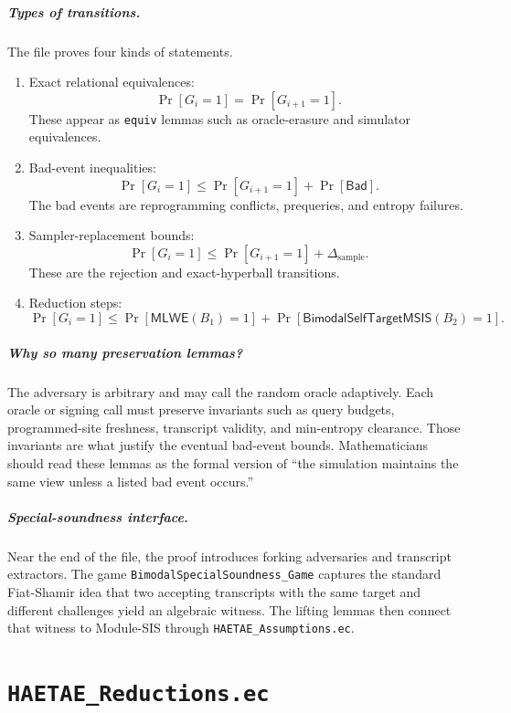 \documentclass[11pt]{report}
\newcommand{\file}[1]{\nolinkurl{#1}}
\newcommand{\ec}[1]{\nolinkurl{#1}}
\newcommand{\ecchapter}[2]{\chapter{\texorpdfstring{\texttt{#1}}{#2}}}
\newcommand{\MLWE}{\mathsf{MLWE}}
\newcommand{\BMSIS}{\mathsf{BimodalSelfTargetMSIS}}
\theoremstyle{definition}
\theoremstyle{plain}
\theoremstyle{definition}
\begin{document}
\paragraph{Types of transitions.}
The file proves four kinds of statements.
\begin{enumerate}[leftmargin=*]
  \item Exact relational equivalences:
  \[
    \Pr[G_i=1] = \Pr[G_{i+1}=1].
  \]
  These appear as \ec{equiv} lemmas such as oracle-erasure and simulator
  equivalences.
  \item Bad-event inequalities:
  \[
    \Pr[G_i=1]\le \Pr[G_{i+1}=1]+\Pr[\mathsf{Bad}].
  \]
  The bad events are reprogramming conflicts, prequeries, and entropy failures.
  \item Sampler-replacement bounds:
  \[
    \Pr[G_i=1]\le \Pr[G_{i+1}=1]+\Delta_{\mathrm{sample}}.
  \]
  These are the rejection and exact-hyperball transitions.
  \item Reduction steps:
  \[
    \Pr[G_i=1]\le
    \Pr[\MLWE(B_1)=1]+\Pr[\BMSIS(B_2)=1].
  \]
\end{enumerate}

\paragraph{Why so many preservation lemmas?}
The adversary is arbitrary and may call the random oracle adaptively.  Each
oracle or signing call must preserve invariants such as query budgets,
programmed-site freshness, transcript validity, and min-entropy clearance.
Those invariants are what justify the eventual bad-event bounds.  Mathematicians
should read these lemmas as the formal version of ``the simulation maintains
the same view unless a listed bad event occurs.''

\paragraph{Special-soundness interface.}
Near the end of the file, the proof introduces forking adversaries and
transcript extractors.  The game \ec{BimodalSpecialSoundness_Game} captures the
standard Fiat-Shamir idea that two accepting transcripts with the same target
and different challenges yield an algebraic witness.  The lifting lemmas then
connect that witness to Module-SIS through \file{HAETAE_Assumptions.ec}.



\ecchapter{HAETAE\_Reductions.ec}{HAETAE Reductions.ec}
\end{document}
